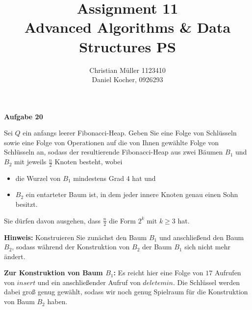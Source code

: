 \documentclass{article}
\begin{document}
\title{Assignment 11 \\ Advanced Algorithms \& Data Structures PS}%
\author{Christian Müller 1123410 \\ Daniel Kocher, 0926293}%
\maketitle

{\bfseries Aufgabe 20}%

Sei $Q$ ein anfangs leerer Fibonacci-Heap. Geben Sie eine Folge von Schl{\"u}sseln
sowie eine Folge von Operationen auf die von Ihnen gew{\"a}hlte Folge von
Schl{\"u}sseln an, sodass der resultierende Fibonacci-Heap aus zwei B{\"a}umen
$B_1$ und $B_2$ mit jeweils $\frac{n}{2}$ Knoten besteht, wobei
{\parskip0pt
  \begin{itemize}
    \item die Wurzel von $B_1$ mindestens Grad $4$ hat und
    \item $B_2$ ein entarteter Baum ist, in dem jeder innere Knoten genau einen
      Sohn besitzt.
  \end{itemize}
}
Sie d{\"u}rfen davon ausgehen, dass $\frac{n}{2}$ die Form $2^k$ mit $k \geq 3$
hat.

\textbf{Hinweis:} Konstruieren Sie zun{\"a}chst den Baum $B_1$ und
anschlie{\ss}end den Baum $B_2$, sodass w{\"a}hrend der Konstruktion von $B_2$
der Baum $B_1$ sich nicht mehr {\"a}ndert.

\textbf{Zur Konstruktion von Baum $B_1$:} \newline
Es reicht hier eine Folge von $17$ Aufrufen von $insert$ und ein
anschlie{\ss}ender Aufruf von $deletemin$. Die Schl{\"u}ssel werden dabei gro{\ss}
genug gew{\"a}hlt, sodass wir noch genug Spielraum f{\"u}r die Konstruktion von
Baum $B_2$ haben.
\end{document}
